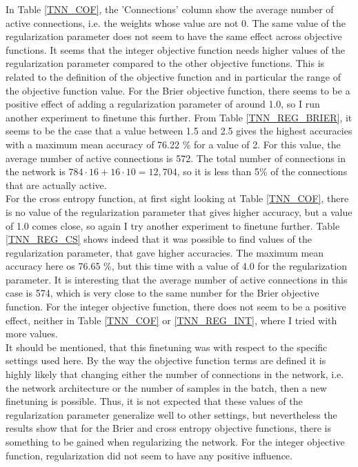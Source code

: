 \noindent In Table \ref{TNN_COF}, the 'Connections' column show the average number of active connections, i.e. the weights whose value are not 0. The same value of the regularization parameter does not seem to have the same effect across objective functions. It seems that the integer objective function needs higher values of the regularization parameter compared to the other objective functions. This is related to the definition of the objective function and in particular the range of the objective function value. For the Brier objective function, there seems to be a positive effect of adding a regularization parameter of around 1.0, so I run another experiment to finetune this further. From Table \ref{TNN_REG_BRIER}, it seems to be the case that a value between 1.5 and 2.5 gives the highest accuracies with a maximum mean accuracy of 76.22 \% for a value of 2. For this value, the average number of active connections is 572. The total number of connections in the network is $784 \cdot 16 + 16 \cdot 10 = 12,704$, so it is less than 5\% of the connections that are actually active. \\

\noindent For the cross entropy function, at first sight looking at Table \ref{TNN_COF}, there is no value of the regularization parameter that gives higher accuracy, but a value of 1.0 comes close, so again I try another experiment to finetune further. Table \ref{TNN_REG_CS} shows indeed that it was possible to find values of the regularization parameter, that gave higher accuracies. The maximum mean accuracy here os 76.65 \%, but this time with a value of 4.0 for the regularization parameter. It is interesting that the average number of active connections in this case is 574, which is very close to the same number for the Brier objective function. For the integer objective function, there does not seem to be a positive effect, neither in Table \ref{TNN_COF} or \ref{TNN_REG_INT}, where I tried with more values. \\

\noindent It should be mentioned, that this finetuning was with respect to the specific settings used here. By the way the objective function terms are defined it is highly likely that changing either the number of connections in the network, i.e. the network architecture or the number of samples in the batch, then a new finetuning is possible. Thus, it is not expected that these values of the regularization parameter generalize well to other settings, but nevertheless the results show that for the Brier and cross entropy objective functions, there is something to be gained when regularizing the network. For the integer objective function, regularization did not seem to have any positive influence. 


